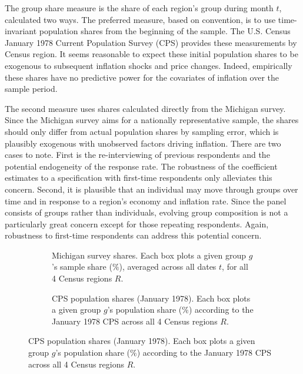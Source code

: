 \documentclass[12pt]{article}
\begin{document}
The group share measure is the share of each region's group during month $t$, calculated two ways. The preferred measure, based on convention, is to use time-invariant population shares from the beginning of the sample. The U.S. Census January 1978 Current Population Survey (CPS) provides these measurements by Census region. It seems reasonable to expect these initial population shares to be exogenous to subsequent inflation shocks and price changes. Indeed, empirically these shares have no predictive power for the covariates of inflation over the sample period.  

The second measure uses shares calculated directly from the Michigan survey. Since the Michigan survey aims for a nationally representative sample, the shares should only differ from actual population shares by sampling error, which is plausibly exogenous with unobserved factors driving inflation. There are two cases to note. First is the re-interviewing of previous respondents and the potential endogeneity of the response rate. The robustness of the coefficient estimates to a specification with first-time respondents only alleviates this concern. Second, it is plausible that an individual may move through groups over time and in response to a region's economy and inflation rate. Since the panel consists of groups rather than individuals, evolving group composition is not a particularly great concern except for those repeating respondents. Again, robustness to first-time respondents can address this potential concern.

\begin{figure}
\centering
\caption{Calculated group shares.}\label{fig:shares}
\begin{subfigure}[t]{\textwidth}
\centering

\caption{Michigan survey shares. Each box plots a given group $g$'s sample share ($\%$), averaged across all dates $t$, for all 4 Census regions $R$.}\label{subfig:shares:group}
\end{subfigure}
\quad
\begin{subfigure}[t]{\textwidth}
\centering

\caption{CPS population shares (January 1978). Each box plots a given group $g$'s population share ($\%$) according to the January 1978 CPS across all 4 Census regions $R$.}\label{subfig:shares:cps}
\end{subfigure}
\end{figure}
\end{document}
